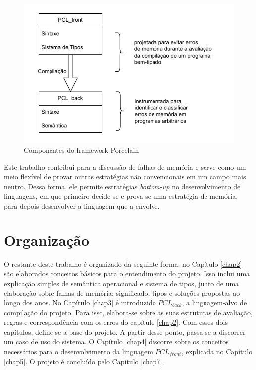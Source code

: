 \begin{figure}[ht]
	\caption{Componentes do framework Porcelain}
	\label{fig:pcl:framework}
	\begin{center}
    \includegraphics[scale=0.9]{figures/pcl.drawio.pdf}
    \end{center}
\end{figure}



Este trabalho contribui para a discussão de falhas de memória e serve como um meio flexível de provar outras estratégias não convencionais em um campo mais neutro. Dessa forma, ele permite estratégias \emph{bottom-up} no desenvolvimento de linguagens, em que primeiro decide-se e prova-se uma estratégia de memória, para depois desenvolver a linguagem que a envolve.

\section{Organização}

O restante deste trabalho é organizado da seguinte forma: no Capítulo \ref{chap2} são elaborados conceitos básicos para o entendimento do projeto. Isso inclui uma explicação simples de semântica operacional e sistema de tipos, junto de uma elaboração sobre falhas de memória: significado, tipos e soluções propostas ao longo dos anos. No Capítulo \ref{chap3} é introduzido $PCL_{back}$, a linguagem-alvo de compilação do projeto. Para isso, elabora-se sobre as suas estruturas de avaliação, regras e correspondência com os erros do capítulo \ref{chap2}. Com esses dois capítulos, define-se a base do projeto. A partir desse ponto, passa-se a discorrer um caso de uso do sistema. O Capítulo \ref{chap4} discorre sobre os conceitos necessários para o desenvolvimento da linguagem $PCL_{front}$, explicada no Capítulo \ref{chap5}. O projeto é concluído pelo Capítulo \ref{chap7}.
